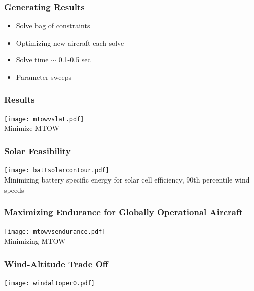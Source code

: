 \documentclass{beamer}
\begin{document}
\begin{frame}
\frametitle{Generating Results}

\begin{itemize}
        \pause
    \item Solve bag of constraints
        \pause
    \item Optimizing new aircraft each solve
        \pause
    \item Solve time $\sim$ 0.1-0.5 sec
        \pause
    \item Parameter sweeps
    \end{itemize}
\end{frame}


\begin{frame}
    \frametitle{Results}

    \pause
    \begin{center}
    \texttt{[image: mtowvslat.pdf]} \\
    Minimize MTOW
    \end{center}

\end{frame}

\begin{frame}
    \frametitle{Solar Feasibility}

    \pause
    \begin{center}
    \texttt{[image: battsolarcontour.pdf]} \\
    Minimizing battery specific energy for solar cell efficiency, 90th percentile wind speeds
    \end{center}

\end{frame}

\begin{frame}
    \frametitle{Maximizing Endurance for Globally Operational Aircraft}

    \pause
    \begin{center}
    \texttt{[image: mtowvsendurance.pdf]} \\
    Minimizing MTOW
    \end{center}

\end{frame}

\begin{frame}
    \frametitle{Wind-Altitude Trade Off}

    \begin{center}
    \texttt{[image: windaltoper0.pdf]} \\
    \end{center}
    
    \[ \]
\end{frame}
\end{document}

